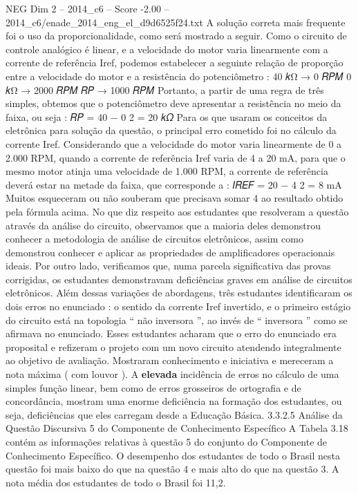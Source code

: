 \begin{textsample}{NEG Dim 2 – 2014\_c6 – Score -2.00 – 2014\_c6/enade\_2014\_eng\_el\_d9d6525f24.txt}
A solução correta mais frequente foi o uso da proporcionalidade, como será mostrado a seguir.
Como o circuito de controle analógico é linear, e a velocidade do motor varia linearmente com a corrente de referência Iref, podemos estabelecer a seguinte relação de proporção entre a velocidade do motor e a resistência do potenciômetro : 40 𝑘Ω → 0 𝑅𝑃𝑀 0 𝑘Ω → 2000 𝑅𝑃𝑀 𝑅𝑃 → 1000 𝑅𝑃𝑀 Portanto, a partir de uma regra de três simples, obtemos que o potenciômetro deve apresentar a resistência no meio da faixa, ou seja : 𝑅𝑃 = 40 − 0 2 = 20 𝑘𝛺 Para os que usaram os conceitos da eletrônica para solução da questão, o principal erro cometido foi no cálculo da corrente Iref.
Considerando que a velocidade do motor varia linearmente de 0 a 2.000 RPM, quando a corrente de referência Iref varia de 4 a 20 mA, para que o mesmo motor atinja uma velocidade de 1.000 RPM, a corrente de referência deverá estar na metade da faixa, que corresponde a : 𝐼𝑅𝐸𝐹 = 20 − 4 2 = 8 mA Muitos esqueceram ou não souberam que precisava somar 4 ao resultado obtido pela fórmula acima.
No que diz respeito aos estudantes que resolveram a questão através da análise do circuito, observamos que a maioria deles demonstrou conhecer a metodologia de análise de circuitos eletrônicos, assim como demonstrou conhecer e aplicar as propriedades de amplificadores operacionais ideais.
Por outro lado, verificamos que, numa parcela significativa das provas corrigidas, os estudantes demonstravam deficiências graves em análise de circuitos eletrônicos.
Além dessas variações de abordagens, três estudantes identificaram os dois erros no enunciado : o sentido da corrente Iref invertido, e o primeiro estágio do circuito está na topologia “ não inversora ”, ao invés de “ inversora ” como se afirmava no enunciado.
Esses estudantes acharam que o erro do enunciado era proposital e refizeram o projeto com um novo circuito atendendo integralmente ao objetivo de avaliação.
Mostraram conhecimento e iniciativa e mereceram a nota máxima ( com louvor ).
A \textbf{elevada} incidência de erros no cálculo de uma simples função linear, bem como de erros grosseiros de ortografia e de concordância, mostram uma enorme deficiência na formação dos estudantes, ou seja, deficiências que eles carregam desde a Educação Básica. 3.3.2.5 Análise da Questão Discursiva 5 do Componente de Conhecimento Específico A Tabela 3.18 contém as informações relativas à questão 5 do conjunto do Componente de Conhecimento Específico.
O desempenho dos estudantes de todo o Brasil nesta questão foi mais baixo do que na questão 4 e mais alto do que na questão 3.
A nota média dos estudantes de todo o Brasil foi 11,2.

\end{textsample}
